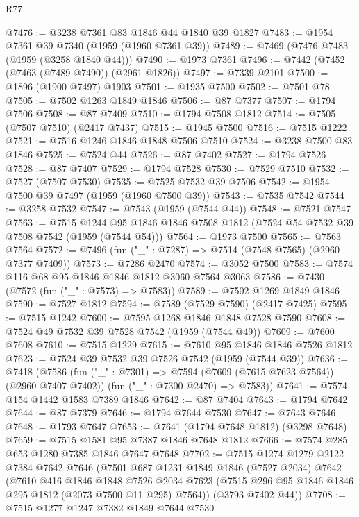 \begin{lexlean}{R77}
\begin{coremodule}
@7476 := @3238 @7361 @83 @1846 @44 @1840 @39 @1827
@7483 := @1954 @7361 @39 @7340 (@1959 (@1960 @7361 @39))
@7489 := @7469 (@7476 @7483 (@1959 (@3258 @1840 @44)))
@7490 := @1973 @7361
@7496 := @7442 (@7452 (@7463 (@7489 @7490)) (@2961 @1826))
@7497 := @7339 @2101
@7500 := @1896 (@1900 @7497) @1903
@7501 := @1935 @7500
@7502 := @7501 @78
@7505 := @7502 @1263 @1849 @1846
@7506 := @87 @7377
@7507 := @1794 @7506
@7508 := @87 @7409
@7510 := @1794 @7508 @1812
@7514 := @7505 (@7507 @7510) (@2417 @7437)
@7515 := @1945 @7500
@7516 := @7515 @1222
@7521 := @7516 @1246 @1846 @1848 @7506 @7510
@7524 := @3238 @7500 @83 @1846
@7525 := @7524 @44
@7526 := @87 @7402
@7527 := @1794 @7526
@7528 := @87 @7407
@7529 := @1794 @7528
@7530 := @7529 @7510
@7532 := @7527 (@7507 @7530)
@7535 := @7525 @7532 @39 @7506
@7542 := @1954 @7500 @39 @7497 (@1959 (@1960 @7500 @39))
@7543 := @7535 @7542
@7544 := @3258 @7532
@7547 := @7543 (@1959 (@7544 @44))
@7548 := @7521 @7547
@7563 := @7515
    @1244
    @95
    @1846
    @1846
    @7508
    @1812
    (@7524 @54 @7532 @39 @7508 @7542 (@1959 (@7544 @54)))
@7564 := @1973 @7500
@7565 := @7563 @7564
@7572 := @7496 (fun ("_" : @7287) => @7514 (@7548 @7565) (@2960 @7377 @7409))
@7573 := @7286 @2470
@7574 := @3052 @7500
@7583 := @7574 @116 @68 @95 @1846 @1846 @1812 @3060 @7564 @3063
@7586 := @7430 (@7572 (fun ("_" : @7573) => @7583))
@7589 := @7502 @1269 @1849 @1846
@7590 := @7527 @1812
@7594 := @7589 (@7529 @7590) (@2417 @7425)
@7595 := @7515 @1242
@7600 := @7595 @1268 @1846 @1848 @7528 @7590
@7608 := @7524 @49 @7532 @39 @7528 @7542 (@1959 (@7544 @49))
@7609 := @7600 @7608
@7610 := @7515 @1229
@7615 := @7610 @95 @1846 @1846 @7526 @1812
@7623 := @7524 @39 @7532 @39 @7526 @7542 (@1959 (@7544 @39))
@7636 := @7418
    (@7586
      (fun ("_" : @7301) => @7594 (@7609 (@7615 @7623 @7564)) (@2960 @7407 @7402))
      (fun ("_" : @7300 @2470) => @7583))
@7641 := @7574 @154 @1442 @1583 @7389 @1846
@7642 := @87 @7404
@7643 := @1794 @7642
@7644 := @87 @7379
@7646 := @1794 @7644 @7530
@7647 := @7643 @7646
@7648 := @1793 @7647
@7653 := @7641 (@1794 @7648 @1812) (@3298 @7648)
@7659 := @7515 @1581 @95 @7387 @1846 @7648 @1812
@7666 := @7574 @285 @653 @1280 @7385 @1846 @7647 @7648
@7702 := @7515
    @1274
    @1279
    @2122
    @7384
    @7642
    @7646
    (@7501
      @687
      @1231
      @1849
      @1846
      (@7527 @2034)
      @7642
      (@7610
        @416
        @1846
        @1848
        @7526
        @2034
        @7623
        (@7515 @296 @95 @1846 @1846 @295 @1812 (@2073 @7500 @11 @295) @7564))
      (@3793 @7402 @44))
@7708 := @7515 @1277 @1247 @7382 @1849 @7644 @7530

\end{coremodule}
\end{lexlean}
